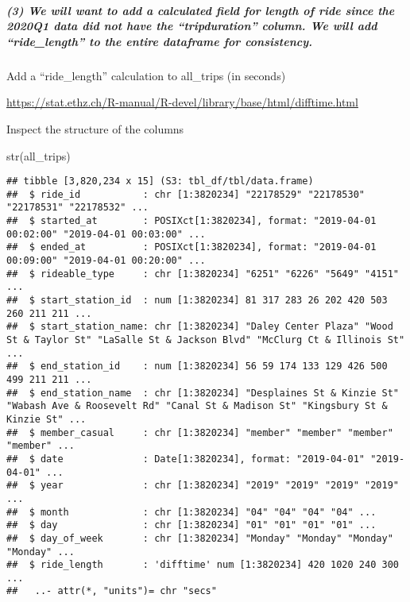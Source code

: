 \documentclass[
]{article}
\newenvironment{Shaded}{\begin{snugshade}}{\end{snugshade}}
\newcommand{\FunctionTok}[1]{\textcolor[rgb]{0.00,0.00,0.00}{#1}}
\newcommand{\NormalTok}[1]{#1}
\newcommand{\OtherTok}[1]{\textcolor[rgb]{0.56,0.35,0.01}{#1}}
\newcommand{\SpecialCharTok}[1]{\textcolor[rgb]{0.00,0.00,0.00}{#1}}
\begin{document}
\hypertarget{we-will-want-to-add-a-calculated-field-for-length-of-ride-since-the-2020q1-data-did-not-have-the-tripduration-column.-we-will-add-ride_length-to-the-entire-dataframe-for-consistency.}{%
\subparagraph{(3) We will want to add a calculated field for length of
ride since the 2020Q1 data did not have the ``tripduration'' column. We
will add ``ride\_length'' to the entire dataframe for
consistency.}\label{we-will-want-to-add-a-calculated-field-for-length-of-ride-since-the-2020q1-data-did-not-have-the-tripduration-column.-we-will-add-ride_length-to-the-entire-dataframe-for-consistency.}}

Add a ``ride\_length'' calculation to all\_trips (in seconds)

\url{https://stat.ethz.ch/R-manual/R-devel/library/base/html/difftime.html}

\begin{Shaded}
\end{Shaded}

Inspect the structure of the columns

\begin{Shaded}
\begin{Highlighting}[]
\FunctionTok{str}\NormalTok{(all\_trips)}
\end{Highlighting}
\end{Shaded}

\begin{verbatim}
## tibble [3,820,234 x 15] (S3: tbl_df/tbl/data.frame)
##  $ ride_id           : chr [1:3820234] "22178529" "22178530" "22178531" "22178532" ...
##  $ started_at        : POSIXct[1:3820234], format: "2019-04-01 00:02:00" "2019-04-01 00:03:00" ...
##  $ ended_at          : POSIXct[1:3820234], format: "2019-04-01 00:09:00" "2019-04-01 00:20:00" ...
##  $ rideable_type     : chr [1:3820234] "6251" "6226" "5649" "4151" ...
##  $ start_station_id  : num [1:3820234] 81 317 283 26 202 420 503 260 211 211 ...
##  $ start_station_name: chr [1:3820234] "Daley Center Plaza" "Wood St & Taylor St" "LaSalle St & Jackson Blvd" "McClurg Ct & Illinois St" ...
##  $ end_station_id    : num [1:3820234] 56 59 174 133 129 426 500 499 211 211 ...
##  $ end_station_name  : chr [1:3820234] "Desplaines St & Kinzie St" "Wabash Ave & Roosevelt Rd" "Canal St & Madison St" "Kingsbury St & Kinzie St" ...
##  $ member_casual     : chr [1:3820234] "member" "member" "member" "member" ...
##  $ date              : Date[1:3820234], format: "2019-04-01" "2019-04-01" ...
##  $ year              : chr [1:3820234] "2019" "2019" "2019" "2019" ...
##  $ month             : chr [1:3820234] "04" "04" "04" "04" ...
##  $ day               : chr [1:3820234] "01" "01" "01" "01" ...
##  $ day_of_week       : chr [1:3820234] "Monday" "Monday" "Monday" "Monday" ...
##  $ ride_length       : 'difftime' num [1:3820234] 420 1020 240 300 ...
##   ..- attr(*, "units")= chr "secs"
\end{verbatim}
\end{document}
